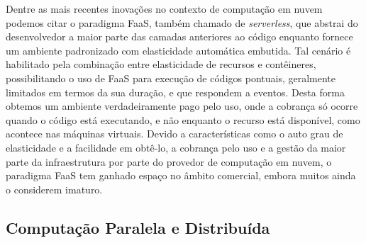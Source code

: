 \documentclass[english,brazilian]{UNISINOSmonografia} %
\begin{document}
Dentre as mais recentes inovações no contexto de computação em nuvem podemos citar o paradigma FaaS, também chamado de \textit{serverless}, que abstrai do desenvolvedor a maior parte das camadas anteriores ao código enquanto fornece um ambiente padronizado com elasticidade automática embutida.
Tal cenário é habilitado pela combinação entre elasticidade de recursos e contêineres, possibilitando o uso de FaaS para execução de códigos pontuais, geralmente limitados em termos da sua duração, e que respondem a eventos.
Desta forma obtemos um ambiente verdadeiramente pago pelo uso, onde a cobrança só ocorre quando o código está executando, e não enquanto o recurso está disponível, como acontece nas máquinas virtuais.
Devido a características como o auto grau de elasticidade e a facilidade em obtê-lo, a cobrança pelo uso e a gestão da maior parte da infraestrutura por parte do provedor de computação em nuvem, o paradigma FaaS tem ganhado espaço no âmbito comercial, embora muitos ainda o considerem imaturo.


\subsection{Computação Paralela e Distribuída}
\label{fundamentacao-computacao-distribuida}


%





\end{document}
